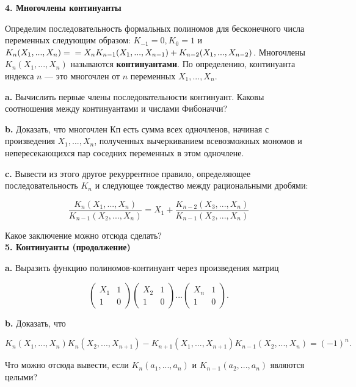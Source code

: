 \restoretop
{}

\noindent \textbf{4. Многочлены континуанты}

Определим последовательность формальных полиномов для 
бесконечного числа переменных следующим образом: $K_{-1} = 0, K_0 = 1$ и
$K_n(X_1,...,X_n)= \\ =X_nK_{n-1}(X_1,...,X_{n-1})+K_{n-2}(X_1,...,X_{n-2})$. Многочлены $K_n(X_1,...,X_n)$ называются \textbf{континуантами}. По определению, континуанта индекса $n$ — это многочлен от $n$ переменных $X_1,...,X_n$.

\textbf{a.} Вычислить первые члены последовательности континуант. Каковы соотношения между континуантами и числами Фибоначчи?

\textbf{b.} Доказать, что многочлен Кп есть сумма всех одночленов, 
начиная с произведения $X_1,...,X_n$, полученных вычеркиванием 
всевозможных мономов и непересекающихся пар соседних переменных в этом 
одночлене.

\textbf{c.} Вывести из этого другое рекуррентное правило, определяющее
последовательность $K_n$ и следующее тождество между рациональными
дробями:

\[
\frac{K_n(X_1,...,X_n)}{K_{n-1}(X_2,...,X_n)} = X_1+\frac{K_{n-2}(X_3,...,X_n)}{K_{n-1}(X_2,...,X_n)}
\]

\noindent Какое заключение можно отсюда сделать?
\\

\noindent \textbf{5. Континуанты (продолжение)}

\textbf{a.} Выразить функцию полиномов-континуант через произведения
матриц

\[
\begin{pmatrix}
X_1 & 1\\
1 & 0
\end{pmatrix} \begin{pmatrix}
X_2 & 1\\
1 & 0
\end{pmatrix} ... \begin{pmatrix}
X_n & 1\\
1 & 0
\end{pmatrix}.
\]

\textbf{b.} Доказать, что

\[
K_n(X_1,...,X_n)K_n(X_2,...,X_{n+1})-K_{n+1}(X_1,...,X_{n+1})K_{n-1}(X_2,...,X_n) = (-1)^n.
\]

\noindent Что можно отсюда вывести, если $K_n(a_1,...,a_n)$ и $K_{n-1}(a_2,...,a_n)$ являются целыми?

